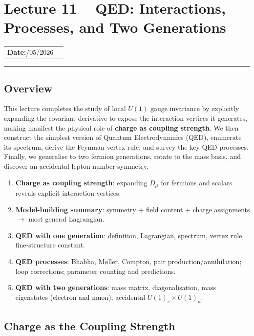\documentclass[../main.tex]{subfiles}
\begin{document}
\section{Lecture 11 -- QED: Interactions, Processes, and Two Generations}\label{sec:lec11}
\begin{center}
\begin{tabular}{ll}
  \textbf{Date:}\quad 14/05/2026 & \\
\end{tabular}
\end{center}
\hrule\vspace{1.5em}

\subsection*{Overview}

This lecture completes the study of local $U(1)$ gauge invariance by explicitly expanding the covariant derivative to expose the interaction vertices it generates, making manifest the physical role of \textbf{charge as coupling strength}.  We then construct the simplest version of Quantum Electrodynamics (QED), enumerate its spectrum, derive the Feynman vertex rule, and survey the key QED processes.  Finally, we generalise to two fermion generations, rotate to the mass basis, and discover an accidental lepton-number symmetry.

\begin{enumerate}
  \item \textbf{Charge as coupling strength}: expanding $D_\mu$ for fermions and scalars reveals explicit interaction vertices.
  \item \textbf{Model-building summary}: symmetry + field content + charge assignments $\to$ most general Lagrangian.
  \item \textbf{QED with one generation}: definition, Lagrangian, spectrum, vertex rule, fine-structure constant.
  \item \textbf{QED processes}: Bhabha, M\o{}ller, Compton, pair production/annihilation; loop corrections; parameter counting and predictions.
  \item \textbf{QED with two generations}: mass matrix, diagonalisation, mass eigenstates (electron and muon), accidental $U(1)_e\times U(1)_\mu$.
\end{enumerate}

\subsection*{Charge as the Coupling Strength}\label{sec:lec11:charge-coupling}
\end{document}
